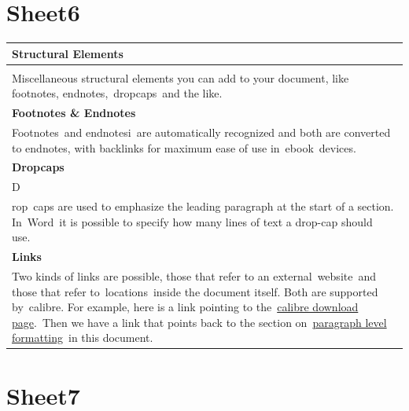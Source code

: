 \documentclass[\officeparserdriver 12pt]{article}
\begin{document}
\section{Sheet6}

\begin{longtable}{|*{1}{>{\raggedright\arraybackslash}p{\dimexpr(\linewidth-2\tabcolsep-2\arrayrulewidth)/1\relax}|}}
\hline
\textcolor{hex365F91}{\textbf{{\fontsize{14pt}{16.8pt}\selectfont Structural Elements~}}} \\
\hline
\endhead
 \\
\hline
\textcolor{hex000000}{Miscellaneous structural elements you can add to your document, like footnotes, endnotes,~dropcaps~and the like.~~} \\
\hline
\textcolor{hex4F81BD}{\textbf{{\fontsize{13pt}{15.6pt}\selectfont Footnotes \& Endnotes~}}} \\
\hline
\textcolor{hex000000}{Footnotes}\textcolor{hex000000}{{\fontsize{9pt}{10.8pt}\selectfont 1}}\textcolor{hex000000}{~and endnotes}\textcolor{hex000000}{{\fontsize{9pt}{10.8pt}\selectfont i}}\textcolor{hex000000}{~are automatically recognized and both are converted to endnotes, with backlinks for maximum ease of use in~ebook~devices.~} \\
\hline
\textcolor{hex4F81BD}{\textbf{{\fontsize{13pt}{15.6pt}\selectfont Dropcaps~}}} \\
\hline
\textcolor{hex000000}{{\fontsize{58pt}{69.6pt}\selectfont D~}} \\
\hline
\textcolor{hex000000}{rop~caps are used to emphasize the leading paragraph at the start of a section. In~Word~it is possible to specify how many lines of text a drop-cap should use.~} \\
\hline
\textcolor{hex4F81BD}{\textbf{{\fontsize{13pt}{15.6pt}\selectfont Links~}}} \\
\hline
\textcolor{hex000000}{Two kinds of links are possible, those that refer to an external~website~and those that refer to~locations~inside the document itself. Both are supported by~calibre. For example, here is a link pointing to the~}\textcolor{hex0000FF}{\uline{calibre download page}}\textcolor{hex000000}{.~Then we have a link that points back to the section on~}\textcolor{hex0000FF}{\uline{paragraph level formatting}}\textcolor{hex000000}{~in this document.~} \\
\hline
\end{longtable}

\section{Sheet7}
\end{document}
